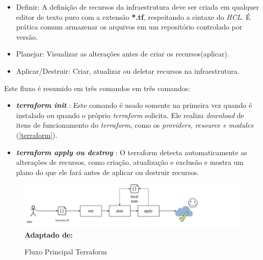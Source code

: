 \begin{itemize}
  \item Definir: A definição de recursos da infraestrutura deve ser criada em qualquer editor de texto puro com a extensão \textbf{*.tf}, respeitando a sintaxe do \textit{HCL}. É prática comum armazenar os arquivos em um repositório controlado por versão.
   \item Planejar: Visualizar as alterações antes de criar os recursos(aplicar).
   \item Aplicar/Destruir: Criar, atualizar ou deletar recursos na infraestrutura. 
\end{itemize}


Este fluxo é resumido em três comandos  em três comandos: 


\begin{itemize}

\item \textbf{\textit{terraform init }}: Este comando é usado somente na primeira vez quando é instalado ou quando o próprio \textit{terraform} solicita. Ele realiza \textit{download} de itens de funcionamento do \textit{terraform}, como os \textit{providers, resource e modules} (\ref{terraform}). 

\item \textbf{\textit{terraform apply ou destroy }}: O terraform  detecta automaticamente as alterações de recursos, como criação, atualização e exclusão e mostra um plano do que ele fará antes de aplicar ou destruir recursos.

\end{itemize}

\begin{figure}[ht]
	\centering	
	\caption[\hspace{0.1cm}Fluxo Principal Terraform]{Fluxo Principal Terraform}
	\vspace{-0.4cm}
	\includegraphics[width=1.2\textwidth]{artigo/figuras/terraform_single_workflow.png}
	 \vspace{-0.2cm}
	\\\textbf{\footnotesize Adaptado de: \cite{Turbinskii}}
	\label{fig:figura7}
\end{figure}
\vspace{-0.5cm}

